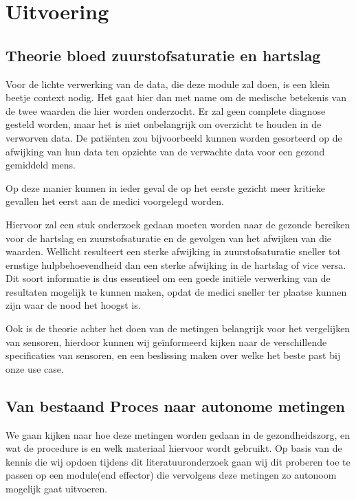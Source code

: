 \documentclass[11pt]{article}
\begin{document}
    \section{Uitvoering}\label{sec:uitvoering}
    \subsection{Theorie bloed zuurstofsaturatie en hartslag}
    Voor de lichte verwerking van de data, die deze module zal doen, is een klein beetje context nodig.
    Het gaat hier dan met name om de medische betekenis van de twee waarden die hier worden onderzocht.
    Er zal geen complete diagnose gesteld worden, maar het is niet onbelangrijk om overzicht te houden in de verworven data.
    De patiënten zou bijvoorbeeld kunnen worden gesorteerd op de afwijking van hun data ten opzichte van de verwachte data voor een gezond gemiddeld mens.

    Op deze manier kunnen in ieder geval de op het eerste gezicht meer kritieke gevallen het eerst aan de medici voorgelegd worden.

    Hiervoor zal een stuk onderzoek gedaan moeten worden naar de gezonde bereiken voor de hartslag en zuurstofsaturatie en de gevolgen van het afwijken van die waarden.
    Wellicht resulteert een sterke afwijking in zuurstofsaturatie sneller tot ernstige hulpbehoevendheid dan een sterke afwijking in de hartslag of vice versa.
    Dit soort informatie is dus essentieel om een goede initiële verwerking van de resultaten mogelijk te kunnen maken, opdat de medici sneller ter plaatse kunnen zijn waar de nood het hoogst is.

    Ook is de theorie achter het doen van de metingen belangrijk voor het vergelijken van sensoren, hierdoor kunnen wij geïnformeerd kijken naar de verschillende specificaties van sensoren, en een beslissing maken over welke het beste past bij onze use case.

    \subsection{Van bestaand Proces naar autonome metingen}
    We gaan kijken naar hoe deze metingen worden gedaan in de gezondheidszorg, en wat de procedure is en welk materiaal hiervoor wordt gebruikt.
    Op basis van de kennis die wij opdoen tijdens dit literatuuronderzoek gaan wij dit proberen toe te passen op een module(end effector) die vervolgens deze metingen zo autonoom mogelijk gaat uitvoeren.
\end{document}
